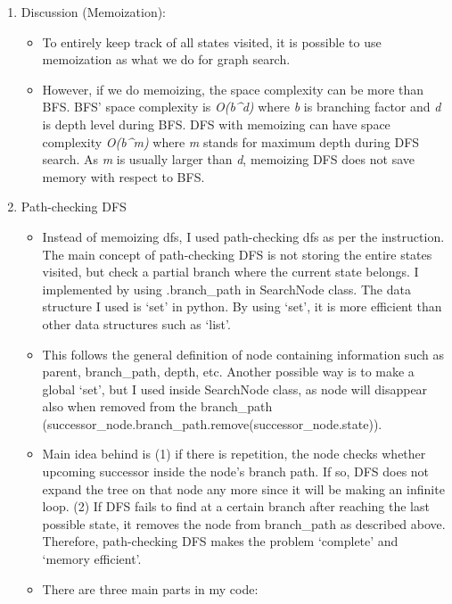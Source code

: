 \documentclass[]{article}
\providecommand{\tightlist}{%
  \setlength{\itemsep}{0pt}\setlength{\parskip}{0pt}}
\begin{document}
\begin{enumerate}
\def\labelenumi{\arabic{enumi}.}
\item
  Discussion (Memoization):

  \begin{itemize}
  \tightlist
  \item
    To entirely keep track of all states visited, it is possible to use
    memoization as what we do for graph search.
  \item
    However, if we do memoizing, the space complexity can be more than
    BFS. BFS' space complexity is \emph{O(b\^{}d)} where \emph{b} is
    branching factor and \emph{d} is depth level during BFS. DFS with
    memoizing can have space complexity \emph{O(b\^{}m)} where \emph{m}
    stands for maximum depth during DFS search. As \emph{m} is usually
    larger than \emph{d}, memoizing DFS does not save memory with
    respect to BFS.
  \end{itemize}
\item
  Path-checking DFS

  \begin{itemize}
  \tightlist
  \item
    Instead of memoizing dfs, I used path-checking dfs as per the
    instruction. The main concept of path-checking DFS is not storing
    the entire states visited, but check a partial branch where the
    current state belongs. I implemented by using .branch\_path in
    SearchNode class. The data structure I used is `set' in python. By
    using `set', it is more efficient than other data structures such as
    `list'.
  \item
    This follows the general definition of node containing information
    such as parent, branch\_path, depth, etc. Another possible way is to
    make a global `set', but I used inside SearchNode class, as node
    will disappear also when removed from the branch\_path
    (successor\_node.branch\_path.remove(successor\_node.state)).
  \item
    Main idea behind is (1) if there is repetition, the node checks
    whether upcoming successor inside the node's branch path. If so, DFS
    does not expand the tree on that node any more since it will be
    making an infinite loop. (2) If DFS fails to find at a certain
    branch after reaching the last possible state, it removes the node
    from branch\_path as described above. Therefore, path-checking DFS
    makes the problem `complete' and `memory efficient'.
  \item
    There are three main parts in my code:


\end{itemize}
\end{enumerate}
\end{document}
